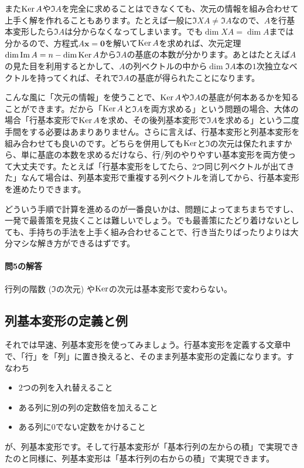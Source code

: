 また$\operatorname{Ker} A$や$\Im A$を完全に求めることはできなくても、次元の情報を組み合わせて上手く解を作れることもあります。たとえば一般に$\Im XA \neq \Im A$なので、$A$を行基本変形したら$\Im A$は分からなくなってしまいます。でも$\dim XA = \dim A$までは分かるので、方程式$A\bm{x} = \bm{0}$を解いて$\operatorname{Ker} A$を求めれば、次元定理$\dim \mathrm{Im}\, A = n - \dim \operatorname{Ker} A$から$\Im A$の基底の本数が分かります。あとはたとえば$A$の見た目を利用するとかして、$A$の列ベクトルの中から$\dim \Im A$本の$1$次独立なベクトルを持ってくれば、それで$\Im A$の基底が得られたことになります。

こんな風に「次元の情報」を使うことで、$\operatorname{Ker} A$や$\Im A$の基底が何本あるかを知ることができます。だから「$\operatorname{Ker} A$と$\Im A$を両方求める」という問題の場合、大体の場合「行基本変形で$\operatorname{Ker} A$を求め、その後列基本変形で$\Im A$を求める」という二度手間をする必要はあまりありません。さらに言えば、行基本変形と列基本変形を組み合わせても良いのです。どちらを併用しても$\operatorname{Ker}$と$\Im$の次元は保たれますから、単に基底の本数を求めるだけなら、行/列のやりやすい基本変形を両方使って大丈夫です。たとえば「行基本変形をしてたら、$2$つ同じ列ベクトルが出てきた」なんて場合は、列基本変形で重複する列ベクトルを消してから、行基本変形を進めたりできます。

どういう手順で計算を進めるのが一番良いかは、問題によってまちまちですし、一発で最善策を見抜くことは難しいでしょう。でも最善策にたどり着けないとしても、手持ちの手法を上手く組み合わせることで、行き当たりばったりよりは大分マシな解き方ができるはずです。

\paragraph{問5の解答}

行列の階数 ($\Im$の次元) や$\operatorname{Ker}$の次元は基本変形で変わらない。

\subsection{列基本変形の定義と例}

それでは早速、列基本変形を使ってみましょう。行基本変形を定義する文章中で、「行」を「列」に置き換えると、そのまま列基本変形の定義になります。すなわち
\begin{itemize}
\item $2$つの列を入れ替えること
\item ある列に別の列の定数倍を加えること
\item ある列に$0$でない定数をかけること
\end{itemize}
が、列基本変形です。そして行基本変形が「基本行列の左からの積」で実現できたのと同様に、列基本変形は「基本行列の右からの積」で実現できます。

